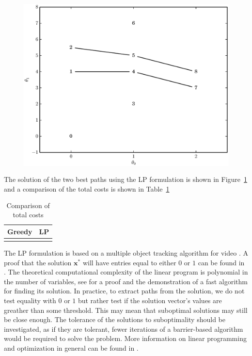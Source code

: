 \begin{figure}[!t]
    \caption{\label{plot:simple_graph_lp_paths}}
    \centering
    \includegraphics[width=\figwidthscale\textwidth]{plots/small_graph_ex_lp_paths.eps}
    \CaptionWithTitle{%
    }{}
\end{figure}

The solution of the two best paths using the LP formulation
is shown in Figure~\ref{plot:simple_graph_lp_paths} and a comparison of the
total costs is shown in Table~\ref{tab:greedy_lp_cost_compare}

\begin{table}
    \caption{\label{tab:greedy_lp_cost_compare} Comparison of total costs}
    \begin{center}
        \begin{tabular}{c c}
            Greedy & LP \\
            \hline
             &
             \\
        \end{tabular}
    \end{center}
\end{table}

The LP formulation is based on a multiple object tracking algorithm for video
\cite{jiang2007linear}. A proof that the solution $\boldsymbol{x}^{\ast}$ will
have entries equal to either $0$ or $1$ can be found in
\cite[p.~167]{parker1988discrete}. The theoretical computational complexity of
the linear program is polynomial in the number of variables, see
\cite{karmarkar1984new} for a proof and the demonstration of a fast algorithm
for finding its solution. In practice, to extract paths from the solution, we do
not test equality with $0$ or $1$ but rather test if the solution vector's
values are greather than some threshold. This may mean that suboptimal solutions
may still be close enough. The tolerance of the solutions to suboptimality
should be investigated, as if they are tolerant, fewer iterations of a
barrier-based algorithm would be required to solve the problem. More information
on linear programming and optimization in general can be found in
\cite{boyd2004convex}.

